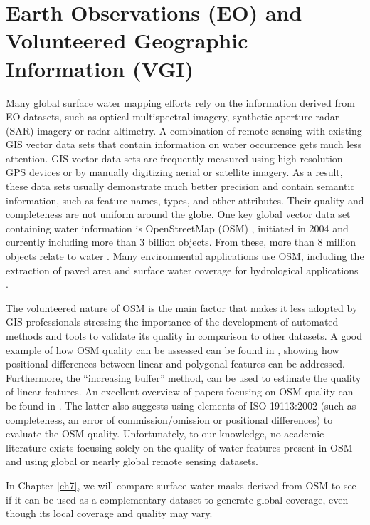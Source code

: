 \section{Earth Observations (EO) and Volunteered Geographic Information (VGI)}
Many global surface water mapping efforts rely on the information derived from EO datasets, such as optical multispectral imagery, synthetic-aperture radar (SAR) imagery or radar altimetry. A combination of remote sensing with existing GIS vector data sets that contain information on water occurrence gets much less attention. GIS vector data sets are frequently measured using high-resolution GPS devices or by manually digitizing aerial or satellite imagery. As a result, these data sets usually demonstrate much better precision and contain semantic information, such as feature names, types, and other attributes. Their quality and completeness are not uniform around the globe. One key global vector data set containing water information is OpenStreetMap (OSM) \citep{Haklay2010}, initiated in 2004 and currently including more than 3 billion objects. From these, more than 8 million objects relate to water \citep{webOSMTagInfo}. Many environmental applications use OSM, including the extraction of paved area and surface water coverage for hydrological applications \citep{Schellekens2014}. 

The volunteered nature of OSM is the main factor that makes it less adopted by GIS professionals \citep{Mooney2010} stressing the importance of the development of automated methods and tools to validate its quality in comparison to other datasets. A good example of how OSM quality can be assessed can be found in \citep{Girres2010}, showing how positional differences between linear and polygonal features can be addressed. Furthermore, the “increasing buffer” method, \citep{Goodchild1997} can be used to estimate the quality of linear features. An excellent overview of papers focusing on OSM quality can be found in \citep{Barron2014}. The latter also suggests using elements of ISO 19113:2002 \citep{iso2002} (such as completeness, an error of commission/omission or positional differences) to evaluate the OSM quality. Unfortunately, to our knowledge, no academic literature exists focusing solely on the quality of water features present in OSM and using global or nearly global remote sensing datasets. 

In Chapter \ref{ch7}, we will compare surface water masks derived from OSM to see if it can be used as a complementary dataset to generate global coverage, even though its local coverage and quality may vary. 


